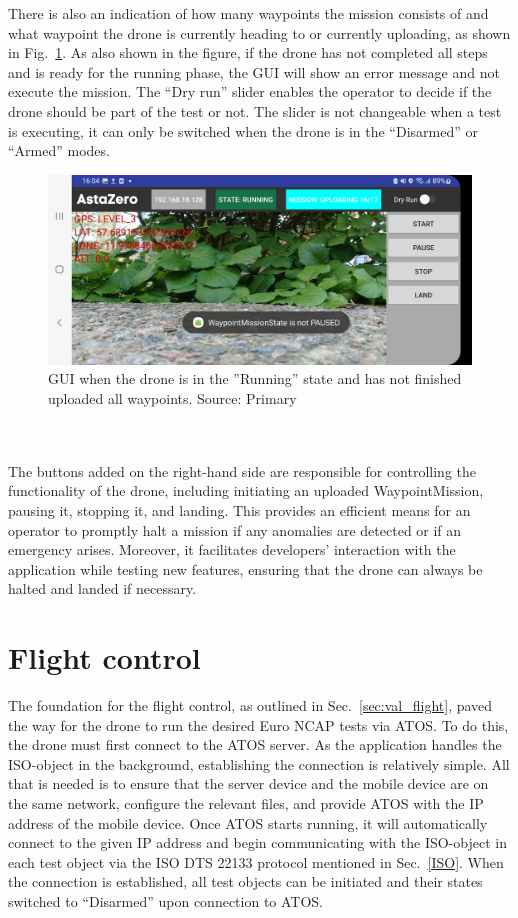 There is also an indication of how many waypoints the mission consists of and what waypoint the drone is currently heading to or currently uploading, as shown in Fig.~\ref{fig:gui_running_fail}. As also shown in the figure, if the drone has not completed all steps and is ready for the running phase, the GUI will show an error message and not execute the mission. The ``Dry run'' slider enables the operator to decide if the drone should be part of the test or not. The slider is not changeable when a test is executing, it can only be switched when the drone is in the ``Disarmed'' or ``Armed'' modes. 
\begin{figure}[h!]
    \centering
    \includegraphics[width=1\textwidth]{figure/gui_running_fail.jpg}
    \caption{GUI when the drone is in the ''Running'' state and has not finished uploaded all waypoints. Source: Primary}
    \label{fig:gui_running_fail}
\end{figure}
\\ \\
The buttons added on the right-hand side are responsible for controlling the functionality of the drone, including initiating an uploaded WaypointMission, pausing it, stopping it, and landing. This provides an efficient means for an operator to promptly halt a mission if any anomalies are detected or if an emergency arises. Moreover, it facilitates developers' interaction with the application while testing new features, ensuring that the drone can always be halted and landed if necessary.
\section{Flight control} \label{res:FLIGHT}

The foundation for the flight control, as outlined in Sec.~\ref{sec:val_flight}, paved the way for the drone to run the desired Euro NCAP tests via ATOS. To do this, the drone must first connect to the ATOS server. As the application handles the ISO-object in the background, establishing the connection is relatively simple. All that is needed is to ensure that the server device and the mobile device are on the same network, configure the relevant files, and provide ATOS with the IP address of the mobile device. Once ATOS starts running, it will automatically connect to the given IP address and begin communicating with the ISO-object in each test object via the ISO DTS 22133 protocol mentioned in Sec.~\ref{ISO}. When the connection is established, all test objects can be initiated and their states switched to ``Disarmed'' upon connection to ATOS.\newline


